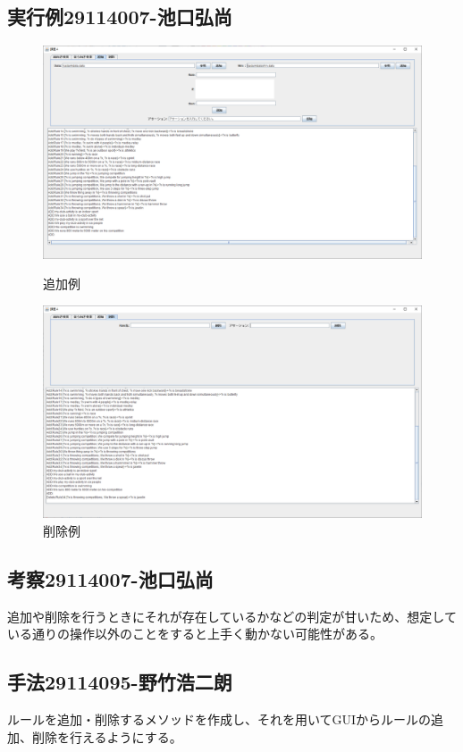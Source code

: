 \documentclass{jarticle}
\begin{document}
\subsection{実行例29114007-池口弘尚}
\begin{figure}[!hbt]
  \centering
  \includegraphics[scale=0.25]{007/GUI2.png}
  \caption{追加例}
  \label{fig:Add}
  \centering
  \includegraphics[scale=0.25]{007/GUI3.png}
  \caption{削除例}
  \label{fig:Remove}

  
\end{figure}
\subsection{考察29114007-池口弘尚}
追加や削除を行うときにそれが存在しているかなどの判定が甘いため、想定している通りの操作以外のことをすると上手く動かない可能性がある。
\subsection{手法29114095-野竹浩二朗}
ルールを追加・削除するメソッドを作成し、それを用いてGUIからルールの追加、削除を行えるようにする。
\end{document}
